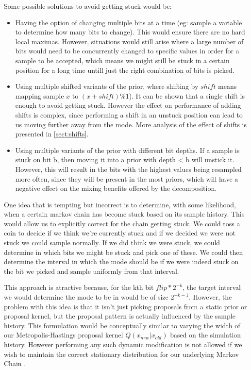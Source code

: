 Some possible solutions to avoid getting stuck would be:
\begin{itemize}

\item
Having the option of changing multiple bits at a time (eg: sample a variable to determine how many bits to change). This would ensure there are no hard local maximas. However, situations would still arise where a large number of bits would need to be concurrently changed to specific values in order for a sample to be accepted, which means we might still be stuck in a certain position for a long time untill just the right combination of bits is picked. 

\item
Using multiple shifted variants of the prior, where shifting by $shift$ means mapping sample $x$ to $(x + shift)\%1$). It can be shown that a single shift is enough to avoid getting stuck. However the effect on performance of adding shifts is complex, since performing a shift in an unstuck position can lead to us moving further away from the mode. More analysis of the effect of shifts is presented in \ref{sect:shifts}.

\item
Using multiple variants of the prior with different bit depths. If a sample is stuck on bit b, then moving it into a prior with depth < b will unstick it. However, this will result in the bits with the highest values being resampled more often, since they will be present in the most priors, which will have a negative effect on the mixing benefits offered by the decomposition. 

\end{itemize}

One idea that is tempting but incorrect is to determine, with some likelihood, when a certain markov chain has become stuck based on its sample history. This would allow us to explicitly correct for the chain getting stuck. We could toss a coin to decide if we think we're currently stuck and if we decided we were not stuck we could sample normally. If we did think we were stuck, we could determine in which bits we might be stuck and pick one of these. We could then determine the interval in which the mode should be if we were indeed stuck on the bit we picked and sample uniformly from that interval.

This approach is atractive because, for the kth bit $flip*2^{-k}$, the target interval we would determine the mode to be in would be of size $2^{-k-1}$. However, the problem with this idea is that it isn't just picking proposals from a static prior or proposal kernel, but the proposal pattern is actually influenced by the sample history. This formulation would be conceptually similar to varying the width of our Metropolis-Hastings proposal kernel $Q(x_{new}|x_{old})$ based on the simulation history. However performing any such dynamic modification is not allowed if we wish to maintain the correct stationary distribution for our underlying Markov Chain \cite[p.~380]{mackay2003information}.

